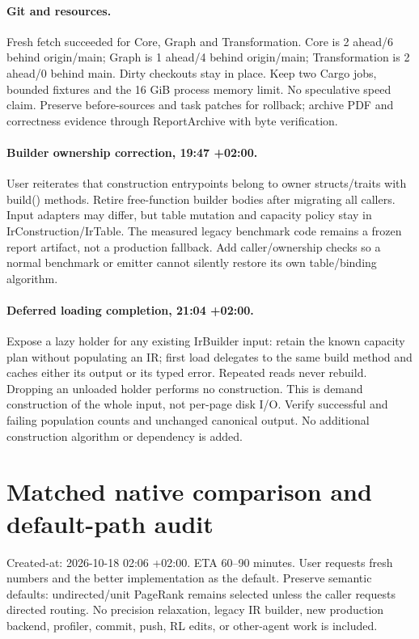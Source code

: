 \documentclass[11pt,a4paper]{article}
\begin{document}
\paragraph{Git and resources.} Fresh fetch succeeded for Core, Graph and
Transformation. Core is 2 ahead/6 behind origin/main; Graph is 1 ahead/4 behind
origin/main; Transformation is 2 ahead/0 behind main. Dirty checkouts stay in place.
Keep two Cargo jobs, bounded fixtures and the 16 GiB process memory limit. No
speculative speed claim. Preserve before-sources and task patches for rollback;
archive PDF and correctness evidence through ReportArchive with byte verification.

\paragraph{Builder ownership correction, 19:47 +02:00.} User reiterates that
construction entrypoints belong to owner structs/traits with build() methods.
Retire free-function builder bodies after migrating all callers. Input adapters
may differ, but table mutation and capacity policy stay in IrConstruction/IrTable.
The measured legacy benchmark code remains a frozen report artifact, not a
production fallback. Add caller/ownership checks so a normal benchmark or emitter
cannot silently restore its own table/binding algorithm.

\paragraph{Deferred loading completion, 21:04 +02:00.} Expose a lazy holder for
any existing IrBuilder input: retain the known capacity plan without populating
an IR; first load delegates to the same build method and caches either its output
or its typed error. Repeated reads never rebuild. Dropping an unloaded holder
performs no construction. This is demand construction of the whole input, not
per-page disk I/O. Verify successful and failing population counts and unchanged
canonical output. No additional construction algorithm or dependency is added.

\newpage\section*{Matched native comparison and default-path audit}
Created-at: 2026-10-18 02:06 +02:00. ETA 60--90 minutes. User requests fresh
numbers and the better implementation as the default. Preserve semantic defaults:
undirected/unit PageRank remains selected unless the caller requests directed
routing. No precision relaxation, legacy IR builder, new production backend,
profiler, commit, push, RL edits, or other-agent work is included.
\end{document}
